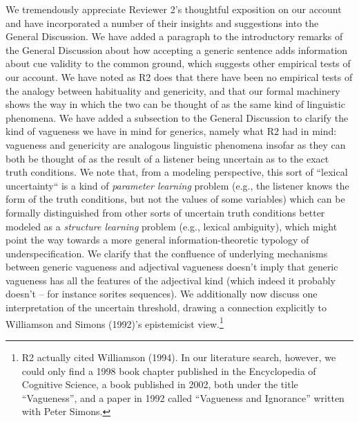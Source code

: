 \documentclass[11pt,letterpaper]{letter} %
\begin{document}
\begin{letter}
We tremendously appreciate Reviewer 2's thoughtful exposition on our account and have incorporated a number of their insights and suggestions into the General Discussion.
We have added a paragraph to the introductory remarks of the General Discussion about how accepting a generic sentence adds information about cue validity to the common ground, which suggests other empirical tests of our account.
We have noted as R2 does that there have been no empirical tests of the analogy between habituality and genericity, and that our formal machinery shows the way in which the two can be thought of as the same kind of linguistic phenomena.
We have added a subsection to the General Discussion to clarify the kind of vagueness we have in mind for generics, namely what R2 had in mind: vagueness and genericity are analogous linguistic phenomena insofar as they can both be thought of as the result of a listener being uncertain as to the exact truth conditions. 
We note that, from a modeling perspective, this sort of ``lexical uncertainty`` is a kind of \emph{parameter learning} problem (e.g., the listener knows the form of the truth conditions, but not the values of some variables) which can be formally distinguished from other sorts of uncertain truth conditions better modeled as a \emph{structure learning} problem (e.g., lexical ambiguity), which might point the way towards a more general information-theoretic typology of underspecification.
We clarify that the confluence of underlying mechanisms between generic vagueness and adjectival vagueness doesn't imply that generic vagueness has all the features of the adjectival kind (which indeed it probably doesn't -- for instance sorites sequences).
We additionally now discuss one interpretation of the uncertain threshold, drawing a connection explicitly to Williamson and Simons (1992)'s epistemicist view.\footnote{
	R2 actually cited Williamson (1994). In our literature search, however, we could only find a 1998 book chapter published in the Encyclopedia of Cognitive Science, a book published in 2002, both under the title ``Vagueness'', and a paper in 1992 called ``Vagueness and Ignorance'' written with Peter Simons. 
}


\end{letter}
\end{document}
